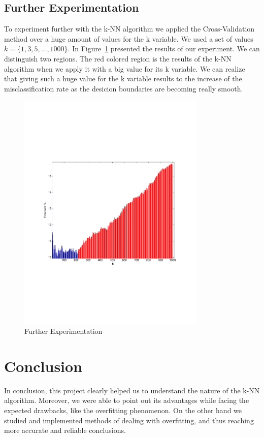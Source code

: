 \documentclass[letterpaper,11pt]{article}
\begin{document}
\subsection*{Further Experimentation}
To experiment further with the k-NN algorithm we applied the Cross-Validation method over a huge amount of values for the k variable. We used a set of values $k= \lbrace 1, 3, 5,\ldots, 1000 \rbrace$. In Figure~\ref{fig:5} presented the results of our experiment. We can distinguish two regions. The red colored region is the results of the k-NN algorithm when we apply it with a big value for its k variable. We can realize that giving such a huge value for the k variable results to the increase of the misclassification rate as the desicion boundaries are becoming really smooth. 

\begin{figure}[!t]
\centering
  \includegraphics[trim = 0cm 7cm 0cm 7cm, clip, width=0.8\textwidth]{figures/FurtherTest.pdf}
  \caption{Further Experimentation}
  \label{fig:5}
\end{figure}

 \section*{Conclusion}
In conclusion, this project clearly helped us to understand the nature of the k-NN algorithm. Moreover, we were able to point out its advantages while facing the expected drawbacks, like the overfitting phenomenon. On the other hand we studied and implemented methods of dealing with overfitting, and thus reaching more accurate and reliable conclusions.


    
\end{document}

